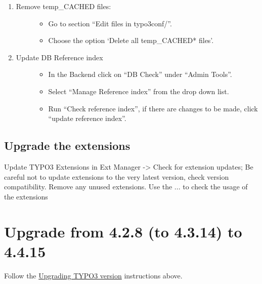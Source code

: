 \documentclass[a4paper,11pt,english]{sphinxmanual}
\begin{document}
\begin{enumerate}
\item {} \begin{description}
\item[{Remove temp\_CACHED files:}] \leavevmode\begin{itemize}
\item {} 
Go to section ``Edit files in typo3conf/''.

\item {} 
Choose the option `Delete all temp\_CACHED* files'.

\end{itemize}

\end{description}

\item {} \begin{description}
\item[{Update DB Reference index}] \leavevmode\begin{itemize}
\item {} 
In the Backend click on ``DB Check'' under ``Admin Tools''.

\item {} 
Select ``Manage Reference index'' from the drop down list.

\item {} 
Run ``Check reference index'', if there are changes to be made, click ``update reference index''.

\end{itemize}

\end{description}

\end{enumerate}


\subsection{Upgrade the extensions}
\label{typo3:upgrade-the-extensions}
Update TYPO3 Extensions in Ext Manager -\textgreater{} Check for extension updates;
Be careful not to update extensions to the very latest version, check version compatibility.
Remove any unused extensions.
Use the ... to check the usage of the extensions


\section{Upgrade from 4.2.8 (to 4.3.14) to 4.4.15}
\label{typo3:upgrade-from-4-2-8-to-4-3-14-to-4-4-15}
Follow the {\hyperref[typo3:upgrading-typo3-version]{Upgrading TYPO3 version}} instructions above.
\end{document}
